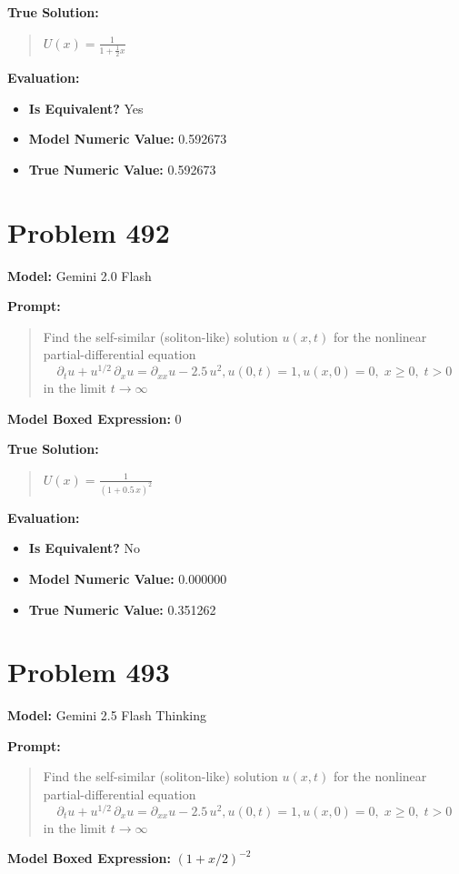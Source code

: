 \documentclass{article}
\begin{document}
\textbf{True Solution:}
\begin{quote}
$U(x)=\frac{1}{1+\frac{1}{2}x}$
\end{quote}

\textbf{Evaluation:}
\begin{itemize}
\item \textbf{Is Equivalent?} Yes
\item \textbf{Model Numeric Value:} 0.592673
\item \textbf{True Numeric Value:} 0.592673
\end{itemize}
\vspace{1cm}
\section*{Problem 492}
\textbf{Model:} Gemini 2.0 Flash

\textbf{Prompt:}
\begin{quote}
Find the self-similar (soliton-like) solution $u(x,t)$ for the nonlinear partial-differential equation $$\partial_t u + u^{1/2}\,\partial_x u = \partial_{xx}u - 2.5\,u^2, u(0,t)=1, u(x,0)=0,\;x\ge0,\;t>0$$ in the limit $t\to\infty$
\end{quote}
\textbf{Model Boxed Expression:} $0$

\textbf{True Solution:}
\begin{quote}
$U(x)=\frac{1}{(1+0.5\,x)^{2}}$
\end{quote}

\textbf{Evaluation:}
\begin{itemize}
\item \textbf{Is Equivalent?} No
\item \textbf{Model Numeric Value:} 0.000000
\item \textbf{True Numeric Value:} 0.351262
\end{itemize}
\vspace{1cm}
\section*{Problem 493}
\textbf{Model:} Gemini 2.5 Flash Thinking

\textbf{Prompt:}
\begin{quote}
Find the self-similar (soliton-like) solution $u(x,t)$ for the nonlinear partial-differential equation $$\partial_t u + u^{1/2}\,\partial_x u = \partial_{xx}u - 2.5\,u^2, u(0,t)=1, u(x,0)=0,\;x\ge0,\;t>0$$ in the limit $t\to\infty$
\end{quote}
\textbf{Model Boxed Expression:} $(1+x/2)^{-2}$
\end{document}
